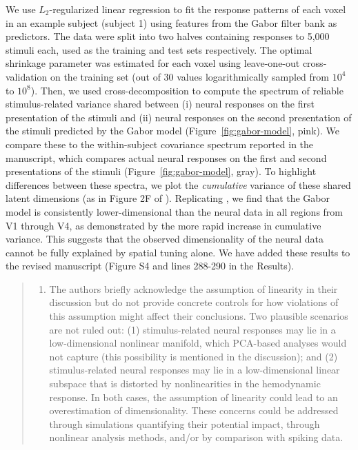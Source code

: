 \documentclass[10pt]{article}
\providecommand{\tightlist}{\setlength{\itemsep}{0pt}\setlength{\parskip}{0pt}}
\begin{document}
We use \(L_2\)-regularized linear regression to fit the response patterns of each voxel in an example subject (subject 1) using features from the Gabor filter bank as predictors. The data were split into two halves containing responses to 5,000 stimuli each, used as the training and test sets respectively. The optimal shrinkage parameter was estimated for each voxel using leave-one-out cross-validation on the training set (out of 30 values logarithmically sampled from \(10^4\) to \(10^8\)). Then, we used cross-decomposition to compute the spectrum of reliable stimulus-related variance shared between (i) neural responses on the first presentation of the stimuli and (ii) neural responses on the second presentation of the stimuli predicted by the Gabor model (Figure~\ref{fig:gabor-model}, pink). We compare these to the within-subject covariance spectrum reported in the manuscript, which compares actual neural responses on the first and second presentations of the stimuli (Figure~\ref{fig:gabor-model}, gray). To highlight differences between these spectra, we plot the \emph{cumulative} variance of these shared latent dimensions (as in Figure 2F of \textcite{Stringer2019}). Replicating \textcite{Stringer2019}, we find that the Gabor model is consistently lower-dimensional than the neural data in all regions from V1 through V4, as demonstrated by the more rapid increase in cumulative variance. This suggests that the observed dimensionality of the neural data cannot be fully explained by spatial tuning alone. We have added these results to the revised manuscript (Figure S4 and lines 288-290 in the Results).

\begin{quote}
\begin{enumerate}
\def\labelenumi{\arabic{enumi}.}
\setcounter{enumi}{1}
\tightlist
\item
  The authors briefly acknowledge the assumption of linearity in their discussion but do not provide concrete controls for how violations of this assumption might affect their conclusions. Two plausible scenarios are not ruled out: (1) stimulus-related neural responses may lie in a low-dimensional nonlinear manifold, which PCA-based analyses would not capture (this possibility is mentioned in the discussion); and (2) stimulus-related neural responses may lie in a low-dimensional linear subspace that is distorted by nonlinearities in the hemodynamic response. In both cases, the assumption of linearity could lead to an overestimation of dimensionality. These concerns could be addressed through simulations quantifying their potential impact, through nonlinear analysis methods, and/or by comparison with spiking data.
\end{enumerate}
\end{quote}
\end{document}
